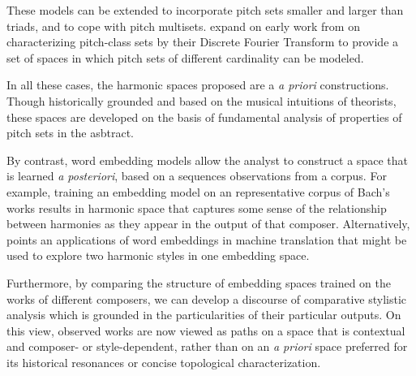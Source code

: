 These models can be extended to incorporate pitch sets smaller and larger than triads, and to cope with pitch multisets. \cite{Quinn2006, Yust2015} expand on early work from \cite{Lewin1959} on characterizing pitch-class sets by their Discrete Fourier Transform to provide a set of spaces in which pitch sets of different cardinality can be modeled.

In all these cases, the harmonic spaces proposed are a \textit{a priori} constructions. Though historically grounded and based on the musical intuitions of theorists, these spaces are developed on the basis of fundamental analysis of properties of pitch sets in the asbtract.

By contrast, word embedding models allow the analyst to construct a space that is learned \textit{a posteriori}, based on a sequences observations from a corpus. For example, training an embedding model on an representative corpus of Bach's works results in harmonic space that captures some sense of the relationship between harmonies as they appear in the output of that composer. Alternatively, \cite{Wolf2014} points an applications of word embeddings in machine translation that might be used to explore two harmonic styles in one embedding space.

Furthermore, by comparing the structure of embedding spaces trained on the works of different composers, we can develop a discourse of comparative stylistic analysis which is grounded in the particularities of their particular outputs. On this view, observed works are now viewed as paths on a space that is contextual and composer- or style-dependent, rather than on an \textit{a priori} space preferred for its historical resonances or concise topological characterization.